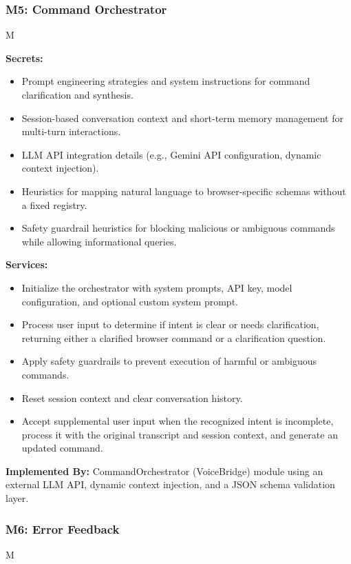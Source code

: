 \documentclass[12pt, titlepage]{article}
\newcounter{mnum}
\newcommand{\mthemnum}{M\themnum}
\begin{document}
\medskip
\subsubsection*{M5: Command Orchestrator} \mthemnum\label{m5}

\textbf{Secrets:}
\begin{itemize}
  \item Prompt engineering strategies and system instructions for command clarification and synthesis.
  \item Session-based conversation context and short-term memory management for multi-turn interactions.
  \item LLM API integration details (e.g., Gemini API configuration, dynamic context injection).
  \item Heuristics for mapping natural language to browser-specific schemas without a fixed registry.
  \item Safety guardrail heuristics for blocking malicious or ambiguous commands while allowing informational queries.
\end{itemize}
\textbf{Services:}
\begin{itemize}
  \item Initialize the orchestrator with system prompts, API key, model configuration, and optional custom system prompt.
  \item Process user input to determine if intent is clear or needs clarification, returning either a clarified browser command or a clarification question.
  \item Apply safety guardrails to prevent execution of harmful or ambiguous commands.
  \item Reset session context and clear conversation history.
  \item Accept supplemental user input when the recognized intent is incomplete, process it with the original transcript and session context, and generate an updated command.
\end{itemize}
\textbf{Implemented By:} CommandOrchestrator (VoiceBridge) module using an external LLM API, dynamic context injection, and a JSON schema validation layer.

\medskip
\subsubsection*{M6: Error Feedback} \mthemnum\label{m6}
\end{document}
